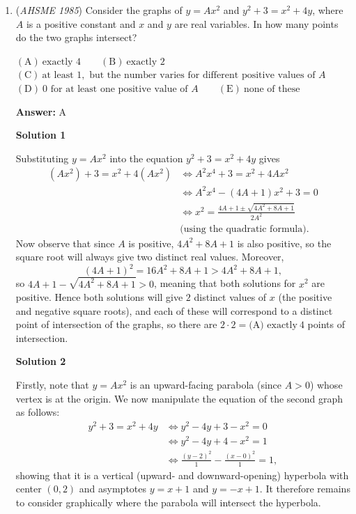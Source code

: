 \begin{enumerate}
 


	\item (\textit{AHSME 1985}) Consider the graphs of $y = Ax^2$ and $y^2+3 = x^2+4y$, where $A$ is a positive constant and $x$ and $y$ are real variables. In how many points do the two graphs intersect?


 $\mathrm{(A) \ }\text{exactly }4 \qquad \mathrm{(B) \ }\text{exactly }2 \qquad$
$\mathrm{(C) \  }\text{at least }1,\text{ but the number varies for different positive values of }A \qquad$
$\mathrm{(D) \  }0\text{ for at least one positive value of }A \qquad \mathrm{(E) \ }\text{none of these}$

 \textbf{Answer: }A



\textbf{Solution 1}

Substituting $y = Ax^2$ into the equation $y^2+3 = x^2+4y$ gives 
 \begin{align*}\left(Ax^2\right)+3 = x^2+4\left(Ax^2\right) &\iff A^2x^4+3 = x^2+4Ax^2 \\ &\iff A^2x^4-\left(4A+1\right)x^2+3 = 0 \\ &\iff x^2 = \frac{4A+1 \pm \sqrt{4A^2+8A+1}}{2A^2} \\ &\text{(using the quadratic formula)}.\end{align*}
 Now observe that since $A$ is positive, $4A^2+8A+1$ is also positive, so the square root will always give two distinct real values. Moreover, 
 \[\left(4A+1\right)^2 = 16A^2+8A+1 > 4A^2+8A+1,\] so $4A+1-\sqrt{4A^2+8A+1} > 0$, meaning that both solutions for $x^2$ are positive. Hence both solutions will give $2$ distinct values of $x$ (the positive and negative square roots), and each of these will correspond to a distinct point of intersection of the graphs, so there are $2 \cdot 2 = \boxed{\text{(A) exactly} \ 4}$ points of intersection.

 



\textbf{Solution 2}

Firstly, note that $y = Ax^2$ is an upward-facing parabola (since $A > 0$) whose vertex is at the origin. We now manipulate the equation of the second graph as follows: 
 \begin{align*}y^2+3 = x^2+4y &\iff y^2-4y+3-x^2 = 0 \\ &\iff y^2-4y+4-x^2 = 1 \\ &\iff \frac{(y-2)^2}{1}-\frac{(x-0)^2}{1} = 1,\end{align*}
 showing that it is a vertical (upward- and downward-opening) hyperbola with center $(0,2)$ and asymptotes $y=x+1$ and $y=-x+1$. It therefore remains to consider graphically where the parabola will intersect the hyperbola.


\end{enumerate}
